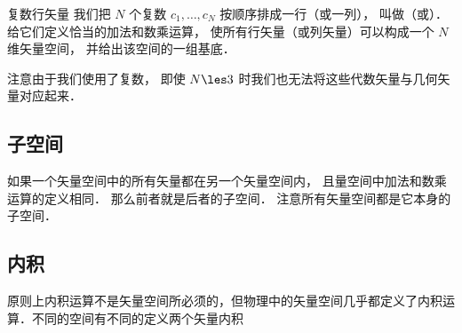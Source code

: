\begin{exer}{复数行矢量}
我们把 $N$ 个复数 $c_1, \dots, c_N$ 按顺序排成一行（或一列）， 叫做（或）． 给它们定义恰当的加法和数乘运算， 使所有行矢量（或列矢量）可以构成一个 $N$ 维矢量空间， 并给出该空间的一组基底．

注意由于我们使用了复数， 即使 $N \les 3$ 时我们也无法将这些代数矢量与几何矢量对应起来．
\end{exer}

\subsection{子空间}
如果一个矢量空间中的所有矢量都在另一个矢量空间内， 且量空间中加法和数乘运算的定义相同． 那么前者就是后者的子空间． 注意所有矢量空间都是它本身的子空间．



\subsection{内积}
原则上内积运算不是矢量空间所必须的，但物理中的矢量空间几乎都定义了内积运算．不同的空间有不同的定义两个矢量内积

